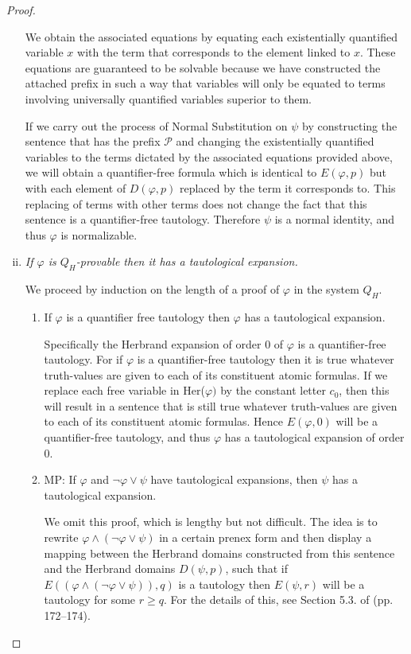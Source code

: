 \documentclass[a4paper,12pt]{report}
\theoremstyle{definition}
\begin{document}
\begin{proof}
\begin{enumerate}[(i)]
We obtain the associated equations by equating each existentially quantified variable $x$ with the term that corresponds to the element linked to $x$. These equations are guaranteed to be solvable because we have constructed the attached prefix in such a way that variables will only be equated to terms involving universally quantified variables superior to them.

If we carry out the process of Normal Substitution on $\psi$ by constructing the sentence that has the prefix $\mathcal{P}$ and changing the existentially quantified variables to the terms dictated by the associated equations provided above, we will obtain a quantifier-free formula which is identical to $E (\varphi, p)$ but with each element of $D( \varphi, p)$ replaced by the term it corresponds to. This replacing of terms with other terms does not change the fact that this sentence is a quantifier-free tautology. Therefore $\psi$ is a normal identity, and thus $\varphi$ is normalizable.

\item \emph{If $\varphi$ is $Q_H$-provable then it has a tautological expansion.}

We proceed by induction on the length of a proof of $\varphi$ in the system $Q_H$.

\begin{enumerate}
\item If $\varphi$ is a quantifier free tautology then $\varphi$ has a tautological expansion.

Specifically the Herbrand expansion of order $0$ of $\varphi$ is a quantifier-free tautology. For if $\varphi$ is a quantifier-free tautology then it is true whatever truth-values are given to each of its constituent atomic formulas. If we replace each free variable in Her($\varphi)$ by the constant letter $c_0$, then this will result in a sentence that is still true whatever truth-values are given to each of its constituent atomic formulas. Hence $E(\varphi, 0)$ will be a quantifier-free tautology, and thus $\varphi$ has a tautological expansion of order 0.

\item MP: If $\varphi$ and $\neg \varphi \lor \psi$ have tautological expansions, then $\psi$ has a tautological expansion.

We omit this proof, which is lengthy but not difficult. The idea is to rewrite $\varphi \land (\neg \varphi \lor \psi)$ in a certain prenex form and then display a mapping between the Herbrand domains constructed from this sentence and the Herbrand domains $D(\psi, p)$, such that if $E((\varphi \land (\neg \varphi \lor \psi)), q)$ is a tautology then $E(\psi, r)$ will be a tautology for some $r \ge q$. For the details of this, see Section 5.3. of \cite{herb english} (pp. 172--174).


\end{enumerate}
\end{enumerate}
\end{proof}
\end{document}
